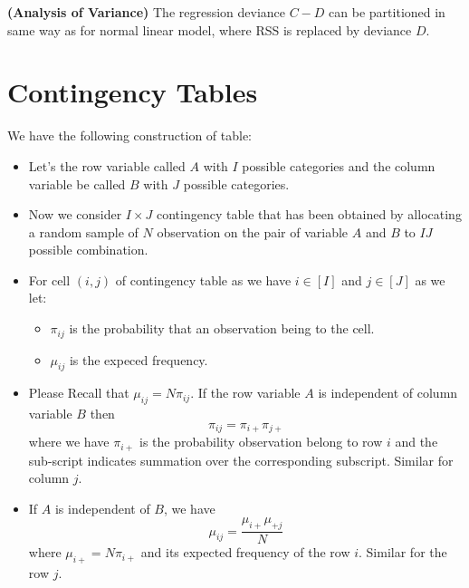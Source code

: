 \begin{remark}{\textbf{(Analysis of Variance)}}
    The regression deviance $C-D$ can be partitioned in same way as for normal linear model, where RSS is replaced by deviance $D$. 
\end{remark}

\section{Contingency Tables}

\begin{remark}
    We have the following construction of table:
    \begin{itemize}
        \item Let's the row variable called $A$ with $I$ possible categories and the column variable be called $B$ with $J$ possible categories. 
        \item Now we consider $I\times J$ contingency table that has been obtained by allocating a random sample of $N$ observation on the pair of variable $A$ and $B$ to $IJ$ possible combination.
        \item For cell $(i,j)$ of contingency table as we have $i\in[I]$ and $j\in[J]$ as we let:
        \begin{itemize}
            \item $\pi_{ij}$ is the probability that an observation being to the cell.
            \item $\mu_{ij}$ is the expeced frequency. 
        \end{itemize}
        \item Please Recall that $\mu_{ij} = N\pi_{ij}$. If the row variable $A$ is independent of column variable $B$ then 
        \begin{equation*}
            \pi_{ij} = \pi_{i+}\pi_{j+}
        \end{equation*}
        where we have $\pi_{i+}$ is the probability observation belong to row $i$ and the sub-script indicates summation over the corresponding subscript. Similar for column $j$.
        \item If $A$ is independent of $B$, we have 
        \begin{equation*}
            \mu_{ij} = \frac{\mu_{i+}\mu_{+j}}{N}
        \end{equation*}
        where $\mu_{i+} = N\pi_{i+}$ and its expected frequency of the row $i$. Similar for the row $j$.
    \end{itemize}
\end{remark}

